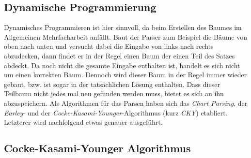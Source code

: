 \subsection{Dynamische Programmierung}
\label{sec:nlp:syn-parsen:dyn-progr}

Dynamisches Programmieren ist hier sinnvoll, da beim Erstellen des Baumes im Allgemeinen Mehrfacharbeit anfällt. Baut der Parser zum Beispiel die Bäume von oben nach unten und versucht dabei die Eingabe von links nach rechts abzudecken, dann findet er in der Regel einen Baum der einen Teil des Satzes abdeckt. Da noch nicht die gesamte Eingabe enthalten ist, handelt es sich nicht um einen korrekten Baum. Dennoch wird dieser Baum in der Regel immer wieder gebaut, bzw. ist sogar in der tatsächlichen Lösung enthalten. Dass dieser Teilbaum nicht jedes mal neu gefunden werden muss, bietet es sich an ihn abzuspeichern. Als Algorithmen für das Parsen haben sich das \textit{Chart Parsing}, der \textit{Earley}- und der \textit{Cocke-Kasami-Younger}-Algorithmus (kurz \textit{CKY}) etabliert. Letzterer wird nachfolgend etwas genauer ausgeführt. 

\subsection{Cocke-Kasami-Younger Algorithmus}
\label{sec:nlp:syn-parsen:cky}

